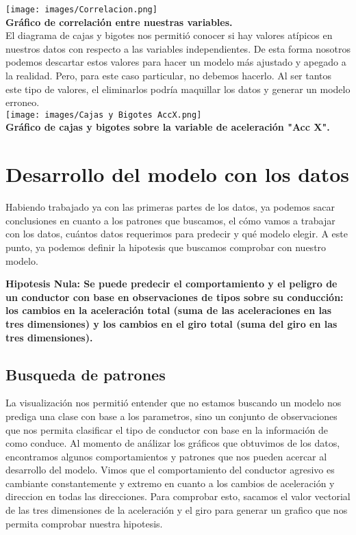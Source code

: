 \documentclass{article}
\begin{document}
        \texttt{[image: images/Correlacion.png]} \\

        \textbf{Gráfico de correlación entre nuestras variables.} \\
        
        El diagrama de cajas y bigotes nos permitió conocer si hay valores atípicos en nuestros datos con respecto a las variables independientes. De esta forma nosotros podemos descartar estos valores para hacer un modelo más ajustado y apegado a la realidad. Pero, para este caso particular, no debemos hacerlo. Al ser tantos este tipo de valores, el eliminarlos podría maquillar los datos y generar un modelo erroneo.\\

        \texttt{[image: images/Cajas y Bigotes AccX.png]} \\

        \textbf{Gráfico de cajas y bigotes sobre la variable de aceleración "Acc X".} \\

\section{Desarrollo del modelo con los datos}

Habiendo trabajado ya con las primeras partes de los datos, ya podemos sacar conclusiones en cuanto a los patrones que buscamos, el cómo vamos a trabajar con los datos, cuántos datos requerimos para predecir y qué modelo elegir. A este punto, ya podemos definir la hipotesis que buscamos comprobar con nuestro modelo. 

    \textbf{Hipotesis Nula: Se puede predecir el comportamiento y el peligro de un conductor con base en observaciones de tipos sobre su conducción: los cambios en la aceleración total (suma de las aceleraciones en las tres dimensiones) y los cambios en el giro total (suma del giro en las tres dimensiones).} \\
        
    \subsection{Busqueda de patrones}

        La visualización nos permitió entender que no estamos buscando un modelo nos prediga una clase con base a los parametros, sino un conjunto de observaciones que nos permita clasificar el tipo de conductor con base en la información de como conduce. Al momento de análizar los gráficos que obtuvimos de los datos, encontramos algunos comportamientos y patrones que nos pueden acercar al desarrollo del modelo. Vimos que el comportamiento del conductor agresivo es cambiante constantemente y extremo en cuanto a los cambios de aceleración y direccion en todas las direcciones. Para comprobar esto, sacamos el valor vectorial de las tres dimensiones de la aceleración y el giro para generar un grafico que nos permita comprobar nuestra hipotesis.
\end{document}
